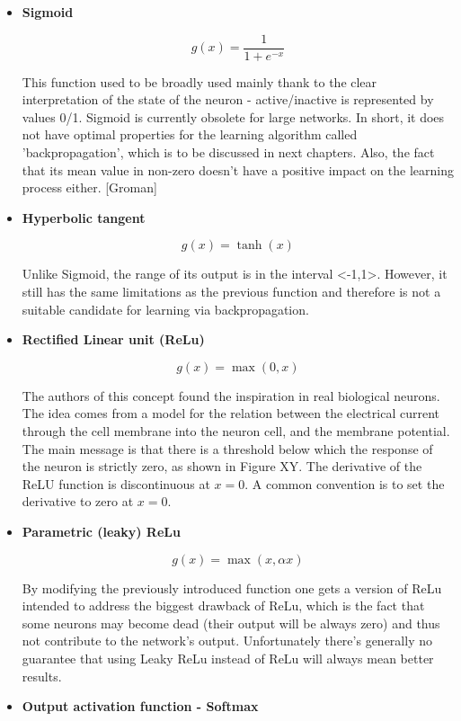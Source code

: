 \begin{itemize}

\item \textbf{Sigmoid}

$$  
g(x)=\frac{1}{1 + e^{-x}}
$$

This function used to be broadly used mainly thank to the clear interpretation of the state of the neuron - active/inactive is represented by values 0/1. Sigmoid is currently obsolete for large networks. In short, it does not have optimal properties for the learning algorithm called 'backpropagation', which is to be discussed in next chapters. Also, the fact that its mean value in non-zero doesn't have a positive impact on the learning process either. [Groman]

\item \textbf{Hyperbolic tangent }

$$  
g(x)=\tanh (x)
$$

Unlike Sigmoid, the range of its output is in the interval <-1,1>. However, it still has the same limitations as the previous function and therefore is not a suitable candidate for learning via backpropagation. 

\item \textbf{Rectified Linear unit (ReLu)}

$$
g(x)=\max (0,x)
$$

The authors of this concept found the inspiration in real biological neurons. The idea comes from a model for the relation between the electrical current through the cell membrane into the neuron cell, and the membrane potential. The main message is that there is a threshold below which the response of the neuron is strictly zero, as shown in Figure XY. The derivative of the ReLU function is discontinuous at $ x=0 $. A common convention is to set the derivative to zero at $ x=0 $.  

\item \textbf{Parametric (leaky) ReLu}

$$
g(x)=\max(x,\alpha x)
$$

By modifying the previously introduced function one gets a version of ReLu intended to address the biggest drawback of ReLu, which is the fact that some neurons may become dead (their output will be always zero) and thus not contribute to the network's output. Unfortunately there's generally no guarantee that using Leaky ReLu instead of ReLu will always mean better results. 

\item \textbf{Output activation function - Softmax}


\end{itemize}
